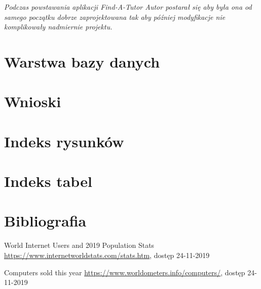 \documentclass[12pt]{article}
\numberwithin{figure}{section}
\begin{document}
\begin{sloppypar}
\textit{Podczas powstawania aplikacji Find-A-Tutor Autor postarał się aby była ona od samego początku dobrze zaprojektowana tak aby później modyfikacje nie komplikowały nadmiernie projektu. }

\section{Warstwa bazy danych}

\section{Wnioski}

    \clearpage
    
    \section{Indeks rysunków}
        \listoffigures
    \clearpage    
    
    \section{Indeks tabel}
        \listoftables
    \clearpage
    
    \section{Bibliografia}
    \renewcommand{\section}[2]{}
    \begin{thebibliography}{99}
    
    World Internet Users and 2019 Population Stats
    \url{https://www.internetworldstats.com/stats.htm}, dostęp 24-11-2019

    Computers sold this year
    \url{https://www.worldometers.info/computers/}, dostęp 24-11-2019
     

\end{thebibliography}
\end{sloppypar}
\end{document}

